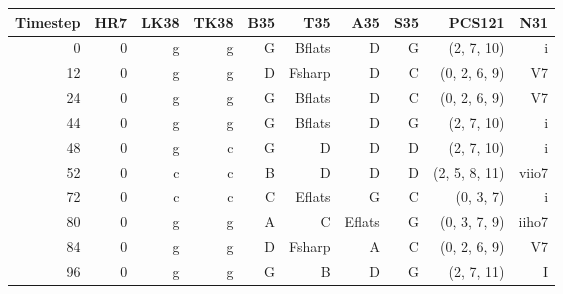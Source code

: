 \begin{tabular}{r|rrrrrrrrr}
    Timestep & HR7 & LK38 & TK38 & B35          & T35          & A35         & S35          & PCS121        & N31   \\ \hline
0        & 0   & g    & g    & G            & B\glspl{flat}  & D           & G            & (2, 7, 10)    & i     \\
12       & 0   & g    & g    & D            & F\gls{sharp} & D           & C            & (0, 2, 6, 9)  & V7    \\
24       & 0   & g    & g    & G            & B\glspl{flat}  & D           & C            & (0, 2, 6, 9)  & V7    \\
44       & 0   & g    & g    & G            & B\glspl{flat}  & D           & G            & (2, 7, 10)    & i     \\ \hline
48       & 0   & g    & c    & G            & D            & D           & D            & (2, 7, 10)    & i     \\
52       & 0   & c    & c    & B            & D            & D           & D            & (2, 5, 8, 11) & viio7 \\
72       & 0   & c    & c    & C            & E\glspl{flat}  & G           & C            & (0, 3, 7)     & i     \\
80       & 0   & g    & g    & A            & C            & E\glspl{flat} & G            & (0, 3, 7, 9)  & iiho7 \\
84       & 0   & g    & g    & D            & F\gls{sharp} & A           & C            & (0, 2, 6, 9)  & V7    \\
96       & 0   & g    & g    & G            & B            & D           & G            & (2, 7, 11)    & I     \\
\end{tabular}
